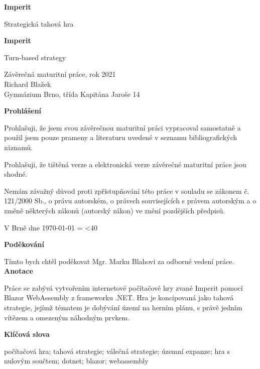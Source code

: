 \documentclass[a4paper,12pt]{article}
\author{Richard Blažek}
\makeatletter
\newcommand{\repeatchar}[2]{%
  \begingroup
  \my@repeat@count=\z@
  \@whilenum\my@repeat@count<#1\do{#2\advance\my@repeat@count\@ne}%
  \endgroup
}
\makeatother
\begin{document}
\begin{titlepage}
    \begin{center}

	\vspace*{3cm}            
	\Huge
	\textbf{Imperit}
            
	\vspace{0.5cm}
	\LARGE
	Strategická tahová hra
        
	\vspace*{1cm}
	\Huge
	\textbf{Imperit}
            
	\vspace{0.5cm}
	\LARGE
	Turn-based strategy
            
	\vfill
            
	\large
        Závěrečná maturitní práce, rok 2021\\
	Richard Blažek\\
	Gymnázium Brno, třída Kapitána Jaroše 14
    \end{center}
\end{titlepage}
\thispagestyle{empty}
\Large\textbf{Prohlášení}\normalsize

Prohlašuji, že jsem svou závěrečnou maturitní práci vypracoval samostatně a použil jsem pouze prameny a literaturu uvedené v seznamu bibliografických záznamů.

Prohlašuji, že tištěná verze a elektronická verze závěrečné maturitní práce jsou shodné.

Nemám závažný důvod proti zpřístupňování této práce v souladu se zákonem č. 121/2000 Sb., o právu autorském, o právech souvisejících s právem autorským a o změně některých zákonů (autorský zákon) ve znění pozdějších předpisů. 

V Brně dne \today{} \repeatchar{40}{.}
\newpage
\thispagestyle{empty}
\Large\textbf{Poděkování}\normalsize

Tímto bych chtěl poděkovat Mgr. Marku Blahovi za odborné vedení práce.
\newpage
\thispagestyle{empty}
\Large\textbf{Anotace}\normalsize

Práce se zabývá vytvořením internetové počítačové hry zvané Imperit pomocí Blazor WebAssembly z frameworku .NET. Hra je koncipovaná jako tahová strategie, jejímž tématem je dobývání území na herním plánu, s právě jedním vítězem a omezeným náhodným prvkem.

\Large\textbf{Klíčová slova}\normalsize

počítačová hra; tahová strategie; válečná strategie; územní expanze; hra s nulovým součtem;\- dotnet; blazor; webassembly
\end{document}
